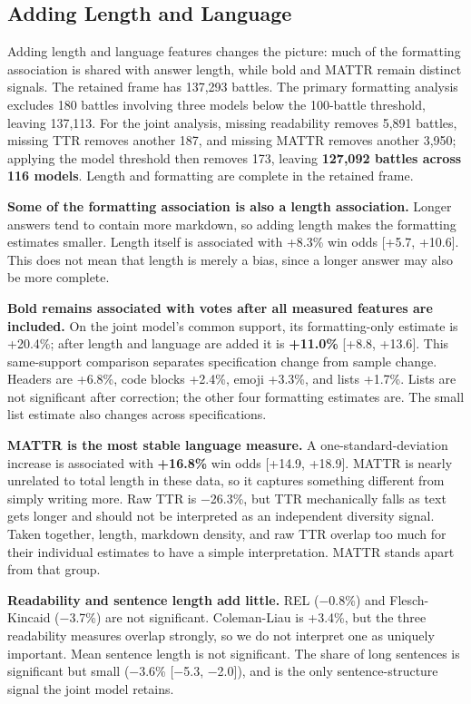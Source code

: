 \documentclass[
]{article}
\begin{document}
\subsection{Adding Length and Language}\label{adding-length-and-language}

Adding length and language features changes the picture: much of the
formatting association is shared with answer length, while bold and
MATTR remain distinct signals. The retained frame has 137,293 battles.
The primary formatting analysis excludes 180 battles involving three
models below the 100-battle threshold, leaving 137,113. For the joint
analysis, missing readability removes 5,891 battles, missing TTR removes
another 187, and missing MATTR removes another 3,950; applying the model
threshold then removes 173, leaving \textbf{127,092 battles across 116
models}. Length and formatting are complete in the retained frame.

\textbf{Some of the formatting association is also a length
association.} Longer answers tend to contain more markdown, so adding
length makes the formatting estimates smaller. Length itself is
associated with +8.3\% win odds {[}+5.7, +10.6{]}. This does not mean
that length is merely a bias, since a longer answer may also be more
complete.

\textbf{Bold remains associated with votes after all measured features
are included.} On the joint model's common support, its formatting-only
estimate is +20.4\%; after length and language are added it is
\textbf{+11.0\%} {[}+8.8, +13.6{]}. This same-support comparison
separates specification change from sample change. Headers are +6.8\%,
code blocks +2.4\%, emoji +3.3\%,
and lists +1.7\%. Lists are not significant after correction; the other
four formatting estimates are. The small list estimate also changes
across specifications.

\textbf{MATTR is the most stable language measure.} A
one-standard-deviation increase is associated with \textbf{+16.8\%} win
odds {[}+14.9, +18.9{]}. MATTR is nearly unrelated to total length in
these data, so it captures something different from simply writing more.
Raw TTR is −26.3\%, but TTR mechanically falls as text gets longer and
should not be interpreted as an independent diversity signal. Taken
together, length, markdown density, and raw TTR overlap too much for
their individual estimates to have a simple interpretation. MATTR stands
apart from that group.

\textbf{Readability and sentence length add little.} REL (−0.8\%) and
Flesch-Kincaid (−3.7\%) are not significant. Coleman-Liau is +3.4\%, but
the three readability measures overlap strongly, so we do not interpret
one as uniquely important. Mean sentence length is not significant. The
share of long sentences is significant but small (−3.6\%
{[}−5.3, −2.0{]}), and is the only sentence-structure signal the joint
model retains.
\end{document}
